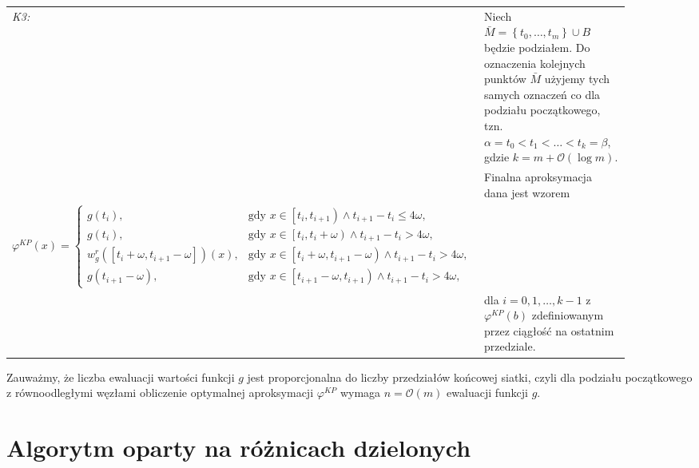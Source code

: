 \documentclass[oik, pdftex, robocza, man]{mgrwms}
\begin{document}
    \begin{table}[H]
        \begin{tabular}{p{0.045\linewidth} p{0.85\linewidth}}
        \textit{K3:}    & Niech $\bar{M} = \left\{ t_{0}, \dots, t_{m} \right\} \cup B$ będzie podziałem. Do oznaczenia kolejnych punktów $\bar{M}$ użyjemy tych samych oznaczeń co dla podziału początkowego, tzn. $\alpha = t_{0} < t_{1} < \ldots < t_{k} = \beta$, gdzie $k = m + \mathcal{O}(\log m)$. \\
        & Finalna aproksymacja dana jest wzorem \\ \vspace{-15pt}
                        $$\varphi^{KP}(x)= \begin{cases}
                            g\left(t_{i}\right),                                                 &\text{gdy } x \in \left[t_{i}, t_{i+1}\right) \land t_{i+1}-t_{i} \leq 4 \omega, \\ 
                            g\left(t_{i}\right),                                                 &\text{gdy } x \in \left[t_{i}, t_{i}+\omega\right) \land t_{i+1}-t_{i}>4 \omega, \\ 
                            w_{g}^{r}\left(\left[t_{i}+\omega, t_{i+1}-\omega\right]\right)(x),  &\text{gdy } x \in\left[t_{i}+\omega, t_{i+1}-\omega\right) \land t_{i+1}-t_{i}>4 \omega, \\ 
                            g\left(t_{i+1}-\omega\right),                                        &\text{gdy } x \in\left[t_{i+1}-\omega, t_{i+1}\right) \land t_{i+1}-t_{i}>4 \omega,
                            \end{cases}$$ \vspace{-10pt} \\
                        & dla $i=0,1,\dots,k-1$ z $\varphi^{KP}(b) $ zdefiniowanym przez ciągłość na ostatnim przedziale. \\
        \end{tabular}
    \end{table}


    Zauważmy, że liczba ewaluacji wartości funkcji $g$ jest proporcjonalna do liczby przedziałów końcowej siatki, czyli dla podziału początkowego z równoodległymi węzłami obliczenie optymalnej aproksymacji $\varphi^{KP}$ wymaga $n = \mathcal{O}(m)$ ewaluacji funkcji $g$.

\section{Algorytm oparty na różnicach dzielonych}
\end{document}
